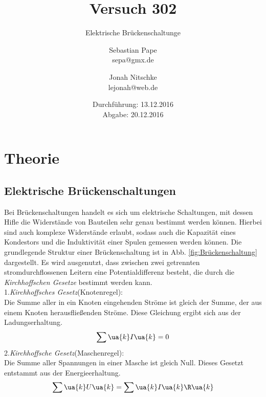 

\title{Versuch 302}
\subtitle{Elektrische Brückenschaltunge}
\author{Sebastian Pape\\
        sepa@gmx.de \and
        Jonah Nitschke\\
        lejonah@web.de}
\date{Durchführung: 13.12.2016\\
      Abgabe: 20.12.2016}


\maketitle
\setcounter{page}{1}
\section{Theorie}
\subsection{Elektrische Brückenschaltungen}
Bei Brückenschaltungen handelt es sich um elektrische Schaltungen, mit dessen
Hifle die Widerstände von Bauteilen sehr genau bestimmt werden können.
Hierbei sind auch komplexe Widerstände erlaubt, sodass auch die Kapazität eines
Kondestors und die Induktivität einer Spulen gemessen werden können.
Die grundlegende Struktur einer Brückenschaltung ist in Abb. \ref{fig:Brückenschaltung}
dargestellt. Es wird ausgenutzt, dass zwischen zwei getrennten stromdurchflossenen
Leitern eine Potentialdifferenz besteht, die durch die \emph{Kirchhoffschen Gesetze}
bestimmt werden kann.\\
1.\emph{Kirchhoffsches Gesetz}(Knotenregel):\\
Die Summe aller in ein Knoten eingehenden Ströme ist gleich der Summe, der aus
einem Knoten herausfließenden Ströme. Diese Gleichung ergibt sich aus der
Ladungserhaltung.
\begin{equation}
  \label{eqn:Kirchhoff1}
  \sum\ua{k} I\ua{k} = 0
\end{equation}
2.\emph{Kirchhoffsche Gesetz}(Maschenregel):\\
Die Summe aller Spannungen in einer Masche ist gleich Null.
Dieses Gesetzt entstammt aus der Energieerhaltung.
\begin{equation}
  \sum\ua{k}U\ua{k} = \sum\ua{k}I\ua{k}\R\ua{k}
\end{equation}

